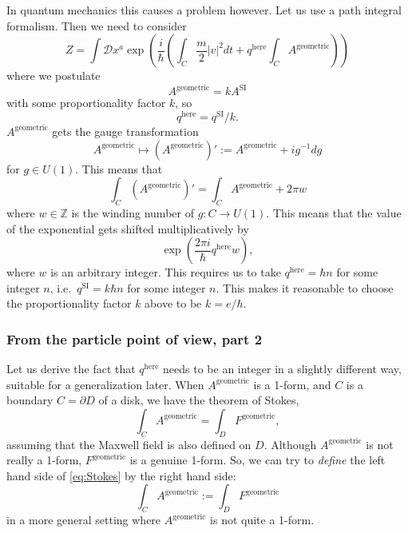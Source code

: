 \documentclass[12pt]{article}
\numberwithin{equation}{section}
\numberwithin{figure}{section}
\theoremstyle{remark}
\def\bZ{\mathbb{Z}}
\begin{document}
In quantum mechanics this causes a problem however. 
Let us use a path integral formalism. Then we need to consider \begin{equation}
Z=\int \mathcal D x^a \exp\left( \frac{i}{\hbar}(\int_C \frac m2 |v|^2 dt  +  q^\text{here} \int_C A^\text{geometric}) \right) 
\end{equation}
where we postulate \begin{equation}
A^\text{geometric} = k A^\text{SI}
\end{equation}
with some proportionality factor $k$, so \begin{equation}
q^\text{here} = q^\text{SI}/k.
\end{equation}
$A^\text{geometric} $ gets the gauge transformation \begin{equation}
A^\text{geometric} \mapsto  (A^\text{geometric}) ' := A^\text{geometric} +  i g^{-1} d g
\end{equation}  for $g\in U(1)$.
This means that \begin{equation}
\int_C (A^\text{geometric})'
=
\int_C A^\text{geometric}
+  2\pi w
\end{equation}
where $w\in \bZ$ is the winding number of $g:C\to U(1)$.
This means that the value of the exponential gets shifted multiplicatively by \begin{equation}
\exp(\frac{2\pi i}{\hbar} q^\text{here} w ),
\end{equation} where $w$ is an arbitrary integer.
This requires us to take $q^\text{here}=\hbar n$ for some integer $n$,
i.e.~$q^\text{SI}= k \hbar n $ for some integer $n$.
This makes it reasonable to choose the proportionality factor $k$ above to be $k=e/\hbar$.

\subsubsection{From the particle point of view, part 2}

Let us derive the fact that $q^\text{here}$ needs to be an integer in a slightly different way,
suitable for a generalization later. 
When $A^\text{geometric}$ is a 1-form, and $C$ is a boundary $C=\partial D$ of a disk,
we have the theorem of Stokes, \begin{equation}
\int _C A^\text{geometric} = \int_D F^\text{geometric},
\label{eq:Stokes}
\end{equation}
assuming that the Maxwell field is also defined on $D$.
Although $A^\text{geometric}$ is not really a 1-form,
$F^\text{geometric}$ is a genuine 1-form.
So, we can try to \emph{define} the left hand side of \eqref{eq:Stokes} by the right hand side: \begin{equation}
\int _C A^\text{geometric} := \int_D F^\text{geometric}
\end{equation}
in a more general setting where $A^\text{geometric}$ is not quite a 1-form.
\end{document}
